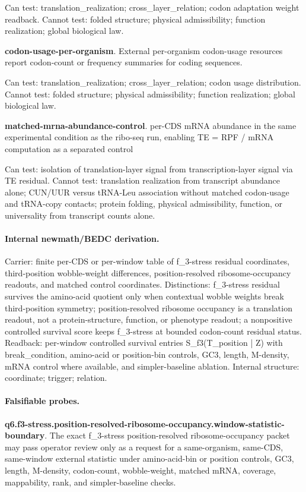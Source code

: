 Can test: translation\_realization; cross\_layer\_relation; codon adaptation weight readback. Cannot test: folded structure; physical admissibility; function realization; global biological law.

\textbf{codon-usage-per-organism}. External per-organism codon-usage resources report codon-count or frequency summaries for coding sequences.

Can test: translation\_realization; cross\_layer\_relation; codon usage distribution. Cannot test: folded structure; physical admissibility; function realization; global biological law.

\textbf{matched-mrna-abundance-control}. per-CDS mRNA abundance in the same experimental condition as the ribo-seq run, enabling TE = RPF / mRNA computation as a separated control

Can test: isolation of translation-layer signal from transcription-layer signal via TE residual. Cannot test: translation realization from transcript abundance alone; CUN/UUR versus tRNA-Leu association without matched codon-usage and tRNA-copy contacts; protein folding, physical admissibility, function, or universality from transcript counts alone.

\paragraph{Internal newmath/BEDC derivation.} Carrier: finite per-CDS or per-window table of f\_3-stress residual coordinates, third-position wobble-weight differences, position-resolved ribosome-occupancy readouts, and matched control coordinates. Distinctions: f\_3-stress residual survives the amino-acid quotient only when contextual wobble weights break third-position symmetry; position-resolved ribosome occupancy is a translation readout, not a protein-structure, function, or phenotype readout; a nonpositive controlled survival score keeps f\_3-stress at bounded codon-count residual status. Readback: per-window controlled survival entries S\_f3(T\_position | Z) with break\_condition, amino-acid or position-bin controls, GC3, length, M-density, mRNA control where available, and simpler-baseline ablation. Internal structure: coordinate; trigger; relation.

\paragraph{Falsifiable probes.}
\textbf{q6.f3-stress.position-resolved-ribosome-occupancy.window-statistic-boundary}. The exact f\_3-stress position-resolved ribosome-occupancy packet may pass operator review only as a request for a same-organism, same-CDS, same-window external statistic under amino-acid-bin or position controls, GC3, length, M-density, codon-count, wobble-weight, matched mRNA, coverage, mappability, rank, and simpler-baseline checks.

